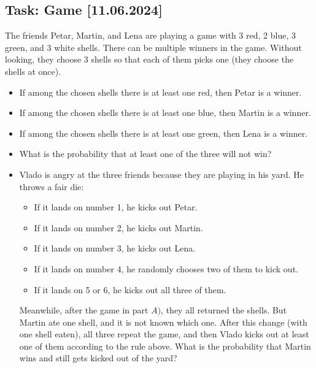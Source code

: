 \documentclass[a4paper, 12pt]{article}
\begin{document}
\subsection*{Task: Game [11.06.2024]}

The friends Petar, Martin, and Lena are playing a game with 3 red, 2 blue, 3 green, and 3 white shells. There can be multiple winners in the game. Without looking, they choose 3 shells so that each of them picks one (they choose the shells at once).

\begin{itemize}
    \item If among the chosen shells there is at least one red, then Petar is a winner.

    \item If among the chosen shells there is at least one blue, then Martin is a winner.

    \item If among the chosen shells there is at least one green, then Lena is a winner.
\end{itemize}

\begin{itemize}
    \item [A)] What is the probability that at least one of the three will not win?

    \item [B)] Vlado is angry at the three friends because they are playing in his yard. He throws a fair die:

\begin{itemize}
    \item If it lands on number 1, he kicks out Petar.

    \item If it lands on number 2, he kicks out Martin.

    \item If it lands on number 3, he kicks out Lena.

    \item If it lands on number 4, he randomly chooses two of them to kick out.

    \item If it lands on 5 or 6, he kicks out all three of them.
\end{itemize}

Meanwhile, after the game in part $A)$, they all returned the shells. But Martin ate one shell, and it is not known which one. After this change (with one shell eaten), all three repeat the game, and then Vlado kicks out at least one of them according to the rule above.
What is the probability that Martin wins and still gets kicked out of the yard?
\end{itemize}
\end{document}
